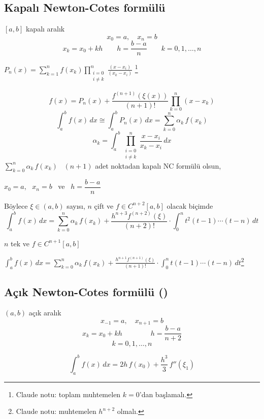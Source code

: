 \documentclass[11pt,a4paper]{article}
\begin{document}
\subsection{Kapalı Newton-Cotes formülü}
$[a,b]$ kapalı aralık
\[ x_0 = a, \quad x_n = b \]
\[ x_k = x_0 + kh \qquad h = \frac{b-a}{n} \qquad k = 0, 1, \dots, n \]
\begin{center}
  $\displaystyle P_n(x) = \sum_{k=1}^{n} f(x_k) \prod_{\substack{i=0 \\ i \neq k}}^{n} \frac{(x - x_i)}{(x_k - x_i)}$%
  \footnote{Claude notu: toplam muhtemelen $k = 0$'dan başlamalı.}
\end{center}
\[ f(x) = P_n(x) + \frac{f^{(n+1)}(\xi(x))}{(n+1)!} \prod_{k=0}^{n} (x - x_k) \]
\[ \int_a^b f(x)\,dx \cong \int_a^b P_n(x)\,dx = \sum_{k=0}^{n} \alpha_k\, f(x_k) \]
\[ \alpha_k = \int_a^b \prod_{\substack{i=0 \\ i \neq k}}^{n} \frac{x - x_i}{x_k - x_i}\,dx \]
$\displaystyle \sum_{k=0}^{n} \alpha_k\, f(x_k)$ \ $(n+1)$ adet noktadan kapalı NC formülü olsun,

\qquad $x_0 = a$, \ $x_n = b$ \ ve \ $h = \dfrac{b-a}{n}$

Böylece $\xi \in (a,b)$ sayısı, $n$ çift ve $f \in C^{n+2}[a,b]$ olacak biçimde
\[
  \int_a^b f(x)\,dx = \sum_{k=0}^{n} \alpha_k\, f(x_k) + \frac{h^{n+3} f^{(n+2)}(\xi)}{(n+2)!}
  \cdot \int_0^n t^2 (t-1) \cdots (t-n)\,dt
\]

$n$ tek ve $f \in C^{n+1}[a,b]$
\begin{center}
  $\displaystyle \int_a^b f(x)\,dx = \sum_{k=0}^{n} \alpha_k\, f(x_k) + \frac{h^{n+1} f^{(n+1)}(\xi)}{(n+1)!}
  \cdot \int_0^n t (t-1) \cdots (t-n)\,dt$\footnote{Claude notu: muhtemelen $h^{n+2}$ olmalı.}
\end{center}

\subsection{Açık Newton-Cotes formülü {\normalsize()}}
$(a,b)$ açık aralık
\[ x_{-1} = a, \quad x_{n+1} = b \]
\[ x_k = x_0 + kh \qquad\qquad h = \frac{b-a}{n+2} \]
\[ k = 0, 1, \dots, n \]
\begin{center}
\end{center}
\[ \int_a^b f(x)\,dx = 2h\, f(x_0) + \frac{h^3}{3}\, f''(\xi_1) \]
\end{document}

